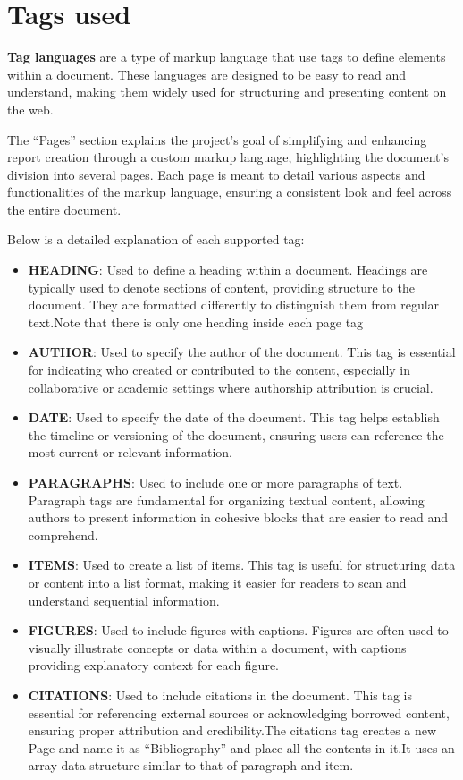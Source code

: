 \documentclass[oneside]{book}
\begin{document}
\section{Tags used}
\textbf{Tag languages} are a type of markup language that use tags to define elements within a document. These languages are designed to be easy to read and 
            understand, making them widely used for structuring and presenting content on the web.\par
The ``Pages'' section explains the project's goal of simplifying and enhancing report creation through a custom markup language, highlighting the document's
            division into several pages. Each page is meant to detail various aspects and functionalities of the markup language, ensuring a consistent look and feel
            across the entire document.\par
Below is a detailed explanation of each supported tag:\par
\begin{itemize}
\item \textbf{HEADING}: Used to define a heading within a document. Headings are typically used to denote sections of content, providing structure to the document.
            They are formatted differently to distinguish them from regular text.Note that there is only one heading inside each page tag
\item \textbf{AUTHOR}: Used to specify the author of the document. This tag is essential for indicating who created or contributed to the content, especially in 
            collaborative or academic settings where authorship attribution is crucial.
\item \textbf{DATE}: Used to specify the date of the document. This tag helps establish the timeline or versioning of the document, ensuring users can reference 
            the most current or relevant information.
\item \textbf{PARAGRAPHS}: Used to include one or more paragraphs of text. Paragraph tags are fundamental for organizing textual content, allowing authors to present
            information in cohesive blocks that are easier to read and comprehend.
\item \textbf{ITEMS}: Used to create a list of items. This tag is useful for structuring data or content into a list format, making it easier for readers to 
            scan and understand sequential information.
\item \textbf{FIGURES}: Used to include figures with captions. Figures are often used to visually illustrate concepts or data within a document,
            with captions providing explanatory context for each figure.
\item \textbf{CITATIONS}: Used to include citations in the document. This tag is essential for referencing external sources or acknowledging borrowed content,
            ensuring proper attribution and credibility.The citations tag creates a new Page and name it as ``Bibliography'' and place all the contents in it.It uses 
            an array data structure similar to that of paragraph and item.
\end{itemize}
\end{document}
